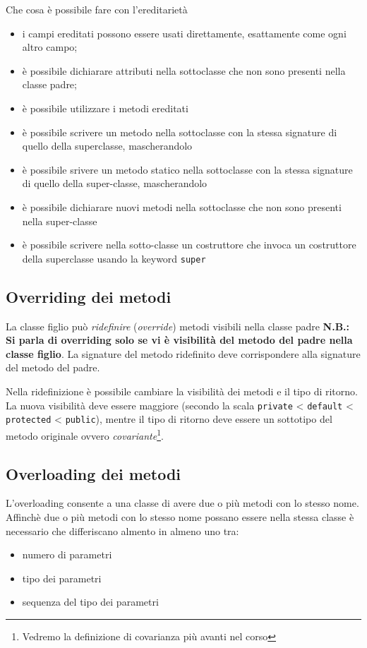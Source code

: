 \documentclass{article}
\begin{document}
Che cosa \`e possibile fare con l'ereditariet\`a
\begin{itemize}
\item i campi ereditati possono essere usati direttamente, esattamente come ogni altro campo;
\item \`e possibile dichiarare attributi nella sottoclasse che non sono presenti nella classe padre;
\item \`e possibile utilizzare i metodi ereditati
\item \`e possibile scrivere un metodo nella sottoclasse con la stessa signature di quello della superclasse, mascherandolo
\item \`e possibile srivere un metodo statico nella sottoclasse con la stessa signature di quello della super-classe, mascherandolo
\item \`e possibile dichiarare nuovi metodi nella sottoclasse che non sono presenti nella super-classe
\item \`e possibile scrivere nella sotto-classe un costruttore che invoca un costruttore della superclasse usando la keyword \texttt{super}
\end{itemize}


\subsection{Overriding dei metodi}
La classe figlio può \emph{ridefinire} (\emph{override}) metodi visibili nella classe padre
\textbf{N.B.: Si parla di overriding solo se vi è visibilit\`a del metodo del padre nella classe figlio}.
La signature del metodo ridefinito deve corrispondere alla signature del metodo del padre.

Nella ridefinizione è possibile cambiare la visibilità dei metodi e il tipo di ritorno.
La nuova visibilità deve essere maggiore (secondo la scala \texttt{private} < \texttt{default} < \texttt{protected} < \texttt{public}), mentre il tipo di ritorno deve essere un sottotipo del metodo
originale ovvero \emph{covariante}\footnote{Vedremo la definizione di covarianza pi\`u avanti nel corso}.

\subsection{Overloading dei metodi}
L'overloading consente a una classe di avere due o pi\`u metodi con lo stesso nome. 
Affinch\`e due o pi\`u metodi con lo stesso nome possano essere nella stessa classe \`e necessario che differiscano almento in almeno uno tra:
\begin{itemize}
\item numero di parametri
\item tipo dei parametri
\item sequenza del tipo dei parametri
\end{itemize}
\end{document}
